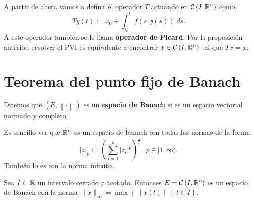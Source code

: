 \begin{notation}
A partir de ahora vamos a definir el operador $\displaystyle T $ actuando en $\displaystyle \mathcal{C}\left(I, \mathbb{R}^{n}\right) $ como 
\[Ty\left(t\right):= x_{0} + \int^{t}_{t_{0}} f\left(s, y\left(s\right)\right) \; d s .\]
A este operador también se le llama \textbf{operador de Picard}. Por la proposición anterior, resolver el PVI es equivalente a encontrar $\displaystyle x \in \mathcal{C}\left(I, \mathbb{R}^{n}\right) $ tal que $\displaystyle Tx = x $. 
\end{notation}
\section{Teorema del punto fijo de Banach}
\begin{definition}
Diremos que $\displaystyle \left(E, \left\| \cdot \right\|\right) $ es un \textbf{espacio de Banach} si es un espacio vectorial normado y completo.
\end{definition}
\begin{eg}
Es sencillo ver que $\displaystyle \mathbb{R}^{n} $ es un espacio de banach con todas las normas de la forma
\[ \left|z\right|_{p}:=\left(\sum^{n}_{i = 1} \left|z_{i}\right|^{p}\right)^{\frac{1}{p}}, \; p \in [1,\infty) .\]
También lo es con la norma infinito.
\end{eg}
\begin{prop}
	Sea $\displaystyle I \subset \mathbb{R} $ un intervalo cerrado y acotado. Entonces $\displaystyle E = \mathcal{C}\left(I, \mathbb{R}^{n}\right) $ es un espacio de Banach con la norma $\displaystyle \|x\|_{\infty}= \max \left\{ \|x\left(t\right)\| \; : \; t \in I\right\}  $.
\end{prop}
